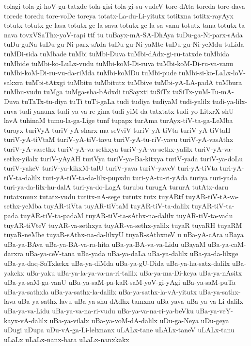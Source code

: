 {tolagi
tola-gi-hoV-gu-tatxde
tola-gisi
tola-gi-su-vudeV
tore-dAta
toreda
tore-dava
torede
toredu
tore-voDe
toreya
totatx-La-du-Li-yitutx
totitxna
totitx-rayAyx
totutx
totutx-ge-lasa
totutx-ge-la-sava
totutx-ge-la-sa-vanu
totutx-tana
totutx-ta-nava
tovxVSaThx-yoV-rapi
ttf
tu
tuBayx-mA-SA-DhAya
tuDu-ga-Ni-parx-sAda
tuDu-guNa
tuDu-gu-Ni-parx-sAda
tuDu-gu-Ni-yaMte
tuDu-gu-Ni-yeMdu
tuLida
tuMDi-sida
tuMbade
tuMbi
tuMbi-Duva
tuMbi-dAdx-gi-ru-tatxde
tuMbida
tuMbide
tuMbi-ko-LuLx-vudu
tuMbi-koM-Di-ruva
tuMbi-koM-Di-ru-va-vanu
tuMbi-koM-Di-ru-vu-da-riMda
tuMbi-koMDu
tuMbi-pude
tuMbi-si-ko-LaLx-loV-sakxra
tuMbi-tAtxgi
tuMbitu
tuMbitutx
tuMbive
tuMbi-yA-LA-padA
tuMbura
tuMbu-vudu
tuMga
tuMga-sha-bAdxdi
tuSayxti
tuSiTx
tuSiTx-yuM-Tu-mA-Duva
tuTaTx-tu-diya
tuTi
tuTi-gaLa
tudi
tudiya
tudiyaM
tudi-yalilx
tudi-ya-lilx-ruva
tudi-yanunx
tudi-ya-va-re-gina
tudi-yiM-da-tatxtatx
tudi-yo-LitxrX-shU-lavA
tuhinaM
tumu-la-ga-Lige
tunf
tupapx
turAma
turAyx-tiV-ta-ga-LeMba
turayx
turiVyA
turiV-yA-sharx-ma-seVviV
turiV-yA-tiVta
turiV-yA-tiVtaH
turiV-yA-tiVtaM
turiV-yA-tiV-tavu
turiV-yA-tu-riV-yavu
turiV-yA-vasAthx
turiV-yA-vasethx
turiV-yA-va-sethxya
turiV-yA-va-sethx-yalilx
turiV-yA-va-sethx-yilalx
turiV-yAyAH
turiVya
turiV-ya-Ba-kitxya
turiV-yada
turiV-ya-doLu
turiV-yakeV
turiV-ya-kikxM-talU
turiV-yava
turiV-yaveV
turi-yA-tiVta
turi-yA-tiV-ta-dalilx
turi-yA-tiV-ta-da-lilx-pupxdu
turi-yA-tu-ri-yAda
turiya
turi-yada
turi-ya-da-lilx-hu-dalA
turi-ya-do-LagA
turubu
turugA
tururA
tutAtx-daru
tutatxnunx
tutatx-vudu
tutitx-nA-sege
tututx
tutx
tuyARtf
tuyAR-tiV-tA-va-sethx-yeMba
tuyAR-tiVta
tuyAR-tiVtaM
tuyAR-tiV-ta-dalilx
tuyAR-tiV-ta-pada
tuyAR-tiV-ta-padaM
tuyAR-tiV-ta-sAthx-na-dalilx
tuyAR-tiV-ta-vadu
tuyAR-tiVteV
tuyAR-va-sethxya
tuyAR-va-sethx-yalilx
tuyaR
tuyaRH
tuyaRM
tuyaR-neMbe
tuyaR-sAthx-na-da-lilxyU
tuyaR-sAthxneV
u
uBa-yA-cAra
uBaya
uBa-ya-BAva
uBa-ya-BA-va-ra-hita
uBa-ya-BA-va-va-Lidu
uBayaM
uBa-ya-caM-darxra
uBa-ya-ceV-tana
uBa-yada
uBa-ya-daLa
uBa-ya-dalilx
uBa-ya-da-lilxge
uBa-ya-daq-SaTxkekx
uBa-ya-diMda
uBa-ya-gU-Dida
uBa-ya-ha-satx-dalilx
uBa-yakekx
uBa-yaku
uBa-ya-la-ya-va-na-ri-talilx
uBa-ya-ma-Di-keya
uBa-ya-nAsitx
uBa-ya-saM-ga-vanU
uBa-ya-saM-pa-kaR-saM-yoV-gi-yAgi
uBa-ya-saM-puTa
uBa-ya-sathxla
uBa-ya-sathx-la-dalilx
uBa-ya-sathx-la-vA-yitutx
uBa-ya-sathx-lava
uBa-ya-sathx-lavu
uBa-ya-shu-dAdhx-tamxnu
uBa-yava
uBa-ya-va-Li-dalilx
uBa-ya-va-Lidu
uBa-ya-va-na-ri-vudu
uBa-ya-va-na-ri-ya-beVku
uBa-ya-veY-kayx-vA-dalilx
uBa-ya-vilalx
uBa-ya-voM-dA-dalilx
uDu-ga-Neya
uDu-geya
uDugi
uDupa
uDu-vA-ga-Li-lelxnanx
uLALx-tane
uLALx-taneV
uLALx-tanu
uLaLx
uLaLx-nanx-bara
uLaLx-nanxkakx
}
